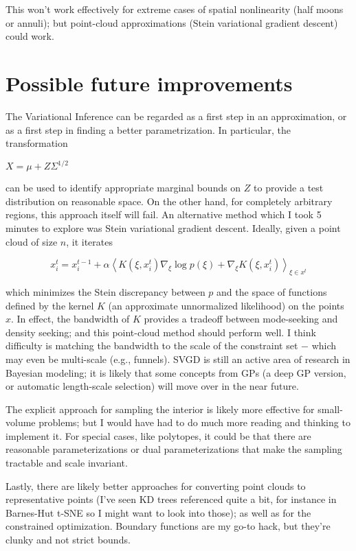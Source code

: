 \documentclass{article}
\begin{document}
This won't work effectively for extreme cases of spatial nonlinearity (half moons or annuli); but point-cloud approximations (Stein variational gradient descent) could work.

\section*{Possible future improvements}

The Variational Inference can be regarded as a first step in an approximation, or as a first step in finding a better parametrization. In particular, the transformation

$X = \mu + Z\Sigma^{1/2}$

can be used to identify appropriate marginal bounds on $Z$ to provide a test distribution on reasonable space. On the other hand, for completely arbitrary regions, this approach itself will fail. An alternative method which I took 5 minutes to explore was Stein variational gradient descent. Ideally, given a point cloud of size $n$, it iterates 

$$x_i^t = x_i^{t-1} + \alpha \left\langle K(\xi, x_i^t)\nabla_\xi \log p(\xi) + \nabla_\xi K(\xi, x_i^t)\right\rangle_{\xi \in x^t}$$

which minimizes the Stein discrepancy between $p$ and the space of functions defined by the kernel $K$ (an approximate unnormalized likelihood) on the points $x$. In effect, the bandwidth of $K$ provides a tradeoff between mode-seeking and density seeking; and this point-cloud method should perform well. I think difficulty is matching the bandwidth to the scale of the constraint set $-$ which may even be multi-scale (e.g., funnels). SVGD is still an active area of research in Bayesian modeling; it is likely that some concepts from GPs (a deep GP version, or automatic length-scale selection) will move over in the near future.

The explicit approach for sampling the interior is likely more effective for small-volume problems; but I would have had to do much more reading and thinking to implement it. For special cases, like polytopes, it could be that there are reasonable parameterizations or dual parameterizations that make the sampling tractable and scale invariant. 

Lastly, there are likely better approaches for converting point clouds to representative points (I've seen KD trees referenced quite a bit, for instance in Barnes-Hut t-SNE so I might want to look into those); as well as for the constrained optimization. Boundary functions are my go-to hack, but they're clunky and not strict bounds. 
\end{document}
